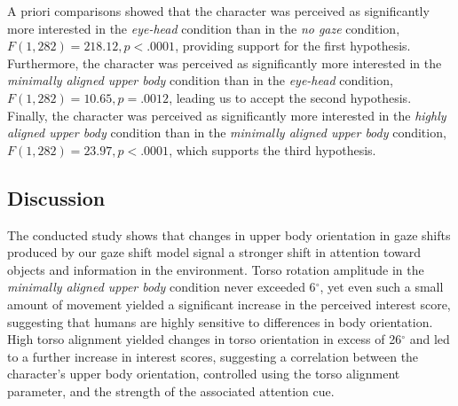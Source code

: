 A priori comparisons showed that the character was perceived as significantly more interested in the \emph{eye-head} condition than in the \emph{no gaze} condition, $F(1, 282) = 218.12, p < .0001$, providing support for the first hypothesis. Furthermore, the character was perceived as significantly more interested in the \emph{minimally aligned upper body} condition than in the \emph{eye-head} condition, $F(1, 282) = 10.65, p = .0012$, leading us to accept the second hypothesis. Finally, the character was perceived as significantly more interested in the \emph{highly aligned upper body} condition than in the \emph{minimally aligned upper body} condition, $F(1, 282) = 23.97, p < .0001$, which supports the third hypothesis.

\subsection{Discussion}

The conducted study shows that changes in upper body orientation in gaze shifts produced by our gaze shift model signal a stronger shift in attention toward objects and information in the environment. Torso rotation amplitude in the \emph{minimally aligned upper body} condition never exceeded 6$^{\circ}$, yet even such a small amount of movement yielded a significant increase in the perceived interest score, suggesting that humans are highly sensitive to differences in body orientation. High torso alignment yielded changes in torso orientation in excess of 26$^{\circ}$ and led to a further increase in interest scores, suggesting a correlation between the character's upper body orientation, controlled using the torso alignment parameter, and the strength of the associated attention cue.